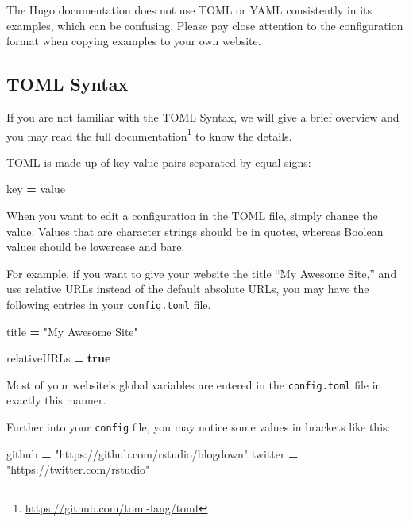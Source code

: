 \documentclass[12pt,]{krantz}
\makeatletter
\newenvironment{Shaded}{\begin{snugshade}}{\end{snugshade}}
\newcommand{\KeywordTok}[1]{\textcolor[rgb]{0.13,0.29,0.53}{\textbf{#1}}}
\newcommand{\NormalTok}[1]{#1}
\newcommand{\OperatorTok}[1]{\textcolor[rgb]{0.81,0.36,0.00}{\textbf{#1}}}
\newcommand{\StringTok}[1]{\textcolor[rgb]{0.31,0.60,0.02}{#1}}
\renewcommand{\href}[2]{#2\footnote{\url{#1}}}
\newenvironment{kframe}{%
\medskip{}
\setlength{\fboxsep}{.8em}
 \def\at@end@of@kframe{}%
 \ifinner\ifhmode%
  \def\at@end@of@kframe{\end{minipage}}%
  \begin{minipage}{\columnwidth}%
 \fi\fi%
 \def\FrameCommand##1{\hskip\@totalleftmargin \hskip-\fboxsep
 \colorbox{shadecolor}{##1}\hskip-\fboxsep
     \hskip-\linewidth \hskip-\@totalleftmargin \hskip\columnwidth}%
 \MakeFramed {\advance\hsize-\width
   \@totalleftmargin\z@ \linewidth\hsize
   \@setminipage}}%
 {\par\unskip\endMakeFramed%
 \at@end@of@kframe}
\renewenvironment{Shaded}{\begin{kframe}}{\end{kframe}}
\theoremstyle{definition}
\theoremstyle{definition}
\theoremstyle{definition}
\theoremstyle{remark}
\makeatother
\begin{document}
The Hugo documentation does not use TOML or YAML consistently in its
examples, which can be confusing. Please pay close attention to the
configuration format when copying examples to your own website.

\hypertarget{toml-syntax}{%
\subsection{TOML Syntax}\label{toml-syntax}}

If you are not familiar with the TOML Syntax, we will give a brief
overview and you may read the
\href{https://github.com/toml-lang/toml}{full documentation} to know the
details.

TOML is made up of key-value pairs separated by equal signs:

\begin{Shaded}
\begin{Highlighting}[]
\NormalTok{key }\OperatorTok{=}\NormalTok{ value}
\end{Highlighting}
\end{Shaded}

When you want to edit a configuration in the TOML file, simply change
the value. Values that are character strings should be in quotes,
whereas Boolean values should be lowercase and bare.

For example, if you want to give your website the title ``My Awesome
Site,'' and use relative URLs instead of the default absolute URLs, you
may have the following entries in your \texttt{config.toml} file.

\begin{Shaded}
\begin{Highlighting}[]
\NormalTok{title }\OperatorTok{=} \StringTok{"My Awesome Site"}

\NormalTok{relativeURLs }\OperatorTok{=} \KeywordTok{true}
\end{Highlighting}
\end{Shaded}

Most of your website's global variables are entered in the
\texttt{config.toml} file in exactly this manner.

Further into your \texttt{config} file, you may notice some values in
brackets like this:

\begin{Shaded}
\begin{Highlighting}[]
\NormalTok{[social]}
\NormalTok{    github  }\OperatorTok{=} \StringTok{"https://github.com/rstudio/blogdown"}
\NormalTok{    twitter }\OperatorTok{=} \StringTok{"https://twitter.com/rstudio"}
\end{Highlighting}
\end{Shaded}
\end{document}
